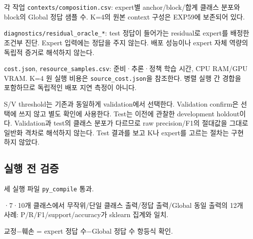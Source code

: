 \par\noindent \textbullet\enspace 각 작업 \texttt{contexts\allowbreak{}/\allowbreak{}\allowbreak{}composi\allowbreak{}tion.\allowbreak{}csv\allowbreak{}}: expert별 anchor/\allowbreak{}block/\allowbreak{}합계 클래스 분포와 block의 Global 정답 샘플 수. K=\allowbreak{}4의 원본 context 구성은 EXP59에 보존되어 있다.


\par\noindent \textbullet\enspace \texttt{diagnost\allowbreak{}ics/\allowbreak{}\allowbreak{}resi\allowbreak{}dual\_\allowbreak{}\allowbreak{}ora\allowbreak{}cle\_\allowbreak{}\allowbreak{}*}: test 정답이 들어가는 residual로 expert를 배정한 조건부 진단. Expert 입력에는 정답을 주지 않는다. 배포 성능이나 expert 자체 역량의 독립적 증거로 해석하지 않는다.


\par\noindent \textbullet\enspace \texttt{cost.\allowbreak{}jso\allowbreak{}n}, \texttt{resource\allowbreak{}\_\allowbreak{}\allowbreak{}samples\allowbreak{}.\allowbreak{}csv}: 준비·추론·정책 학습 시간, CPU RAM/\allowbreak{}GPU VRAM. K=\allowbreak{}4 원 실행 비용은 \texttt{source\_\allowbreak{}\allowbreak{}c\allowbreak{}ost.\allowbreak{}json\allowbreak{}}을 참조한다. 병렬 실행 간 경합을 포함하므로 독립적인 배포 지연 측정이 아니다.


S/\allowbreak{}V threshold는 기존과 동일하게 validation에서 선택한다. Validation confirm은 선택에 쓰지 않고 별도 확인에 사용한다. Test는 이전에 관찰한 development holdout이다. Validation과 test의 클래스 분포가 다르므로 raw precision/\allowbreak{}F1의 절대값을 그대로 일반화 격차로 해석하지 않는다. Test 결과를 보고 K나 expert를 고르는 절차는 구현하지 않았다.

\subsection{실행 전 검증}
\par\noindent \textbullet\enspace 세 실행 파일 \texttt{py\_\allowbreak{}\allowbreak{}compi\allowbreak{}le} 통과.


\par\noindent \textbullet{}·7·10개 클래스에서 무작위/\allowbreak{}단일 클래스 출력/\allowbreak{}정답 출력/\allowbreak{}Global 동일 출력의 12개 사례: P/\allowbreak{}R/\allowbreak{}F1/\allowbreak{}support/\allowbreak{}accuracy가 sklearn 집계와 일치.


\par\noindent \textbullet\enspace 교정−훼손 =\allowbreak{} expert 정답 수−Global 정답 수 항등식 확인.


